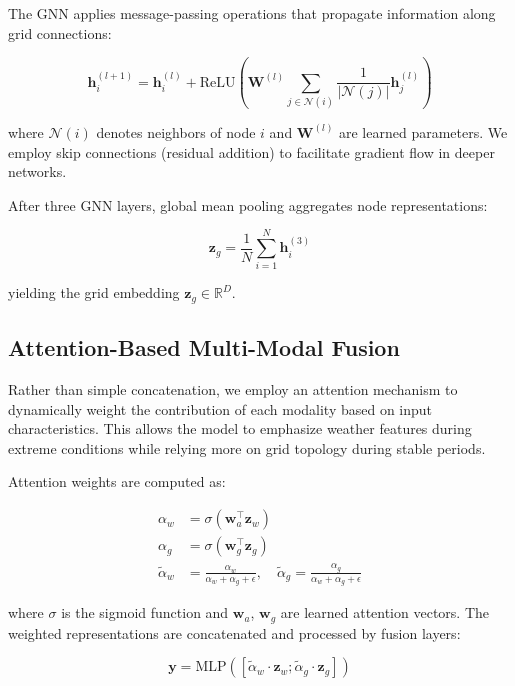 \documentclass[journal,12pt,onecolumn]{IEEEtran}
\begin{document}
The GNN applies message-passing operations that propagate information along grid connections:

\begin{equation}
\mathbf{h}_i^{(l+1)} = \mathbf{h}_i^{(l)} + \text{ReLU}\left(\mathbf{W}^{(l)} \sum_{j \in \mathcal{N}(i)} \frac{1}{|\mathcal{N}(j)|} \mathbf{h}_j^{(l)}\right)
\label{eq:gnn_layer}
\end{equation}

where $\mathcal{N}(i)$ denotes neighbors of node $i$ and $\mathbf{W}^{(l)}$ are learned parameters. We employ skip connections (residual addition) to facilitate gradient flow in deeper networks.

After three GNN layers, global mean pooling aggregates node representations:

\begin{equation}
\mathbf{z}_g = \frac{1}{N} \sum_{i=1}^{N} \mathbf{h}_i^{(3)}
\label{eq:readout}
\end{equation}

yielding the grid embedding $\mathbf{z}_g \in \mathbb{R}^{D}$.

\subsection{Attention-Based Multi-Modal Fusion}

Rather than simple concatenation, we employ an attention mechanism to dynamically weight the contribution of each modality based on input characteristics. This allows the model to emphasize weather features during extreme conditions while relying more on grid topology during stable periods.

Attention weights are computed as:

\begin{align}
\alpha_w &= \sigma(\mathbf{w}_a^\top \mathbf{z}_w) \\
\alpha_g &= \sigma(\mathbf{w}_g^\top \mathbf{z}_g) \\
\tilde{\alpha}_w &= \frac{\alpha_w}{\alpha_w + \alpha_g + \epsilon}, \quad \tilde{\alpha}_g = \frac{\alpha_g}{\alpha_w + \alpha_g + \epsilon}
\end{align}

where $\sigma$ is the sigmoid function and $\mathbf{w}_a$, $\mathbf{w}_g$ are learned attention vectors. The weighted representations are concatenated and processed by fusion layers:

\begin{equation}
\mathbf{y} = \text{MLP}([\tilde{\alpha}_w \cdot \mathbf{z}_w; \tilde{\alpha}_g \cdot \mathbf{z}_g])
\label{eq:fusion}
\end{equation}
\end{document}
